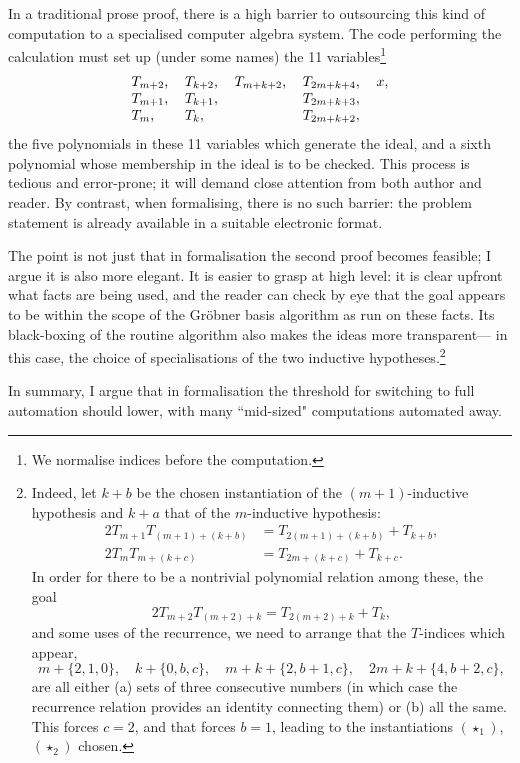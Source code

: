\documentclass[runningheads]{llncs}
\begin{document}
In a traditional prose proof,
there is a high barrier to outsourcing this kind of computation to a specialised computer algebra system.
The code performing the calculation must set up (under some names) the 11 variables\footnote{
  We normalise indices before the computation.
}
\[
  \begin{tabular}{llllll}
  $T_{m+2}$,&
  $T_{k+2}$,&
  $T_{m+k+2}$,&
  $T_{2m+k+4}$,&
  $x$,\\
  $T_{m+1}$,&
  $T_{k+1}$,&&
  $T_{2m+k+3}$,\\
  $T_m$,&
  $T_{k}$,&&
  $T_{2m+k+2},$
  \end{tabular}
\]
the five polynomials in these 11 variables which generate the ideal,
and a sixth polynomial whose membership in the ideal is to be checked.
This process is tedious and error-prone;
it will demand close attention from both author and reader.
By contrast, when formalising, there is no such barrier:
the problem statement is already available in a suitable electronic format.

The point is not just that in formalisation the second proof becomes feasible;
I argue  it is also more elegant.
It is easier to grasp at high level:
it is clear upfront what facts are being used,
and the reader can check by eye that the goal appears to be within the scope of the Gr\"obner basis algorithm as run on these facts.
Its black-boxing of the routine algorithm also makes the ideas more transparent---%
in this case, the choice of specialisations of the two 
inductive hypotheses.\footnote{
Indeed, let $k+b$ be the chosen instantiation of the $(m+1)$-inductive hypothesis
and $k+a$ that of the $m$-inductive hypothesis:
\begin{align*}
  2T_{m+1}T_{(m+1)+(k+b)}&=T_{2(m+1)+(k+b)}+T_{k+b},\\
  2T_mT_{m+(k+c)}&=T_{2m+(k+c)}+T_{k+c}.
\end{align*}
In order for there to be a nontrivial polynomial relation among these, the goal
\[
  2T_{m+2}T_{(m+2)+k}=T_{2(m+2)+k}+T_{k},
\]
and some uses of the recurrence,
we need to arrange that the $T$-indices which appear, 
\[
  m+\{2,1,0\},\quad k+\{0,b, c\},\quad
  m+k+\{2, b+1, c\},\quad 2m+k+\{4, b+2, c\},
\]
are all either (a) sets of three consecutive numbers
(in which case the recurrence relation provides an identity connecting them)
or (b) all the same.
This forces $c=2$, and that forces $b=1$,
leading to the instantiations $(\star_1)$, $(\star_2)$ chosen.}

In summary, I argue that in formalisation the threshold for switching to full automation 
should lower,
with many ``mid-sized" computations automated away.
\end{document}
